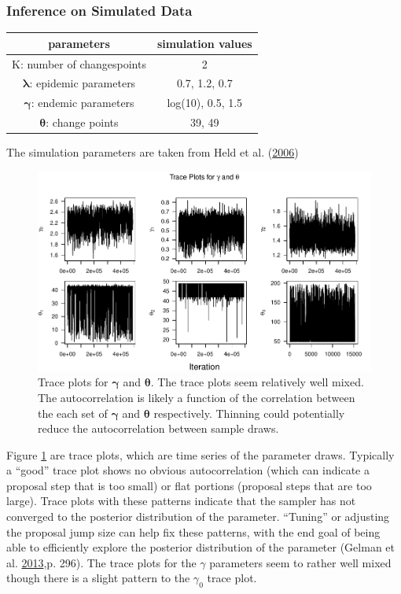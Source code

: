 \documentclass[11pt,a4paper]{article}
\numberwithin{equation}{section}
\begin{document}
\hypertarget{inference-on-simulated-data}{%
\subsubsection{Inference on Simulated
Data}\label{inference-on-simulated-data}}

\begin{longtable}[]{@{}cc@{}}
\toprule
parameters & simulation values\tabularnewline
\midrule
\endhead
K: number of changespoints & 2\tabularnewline
\(\boldsymbol{\lambda}\): epidemic parameters & 0.7, 1.2,
0.7\tabularnewline
\(\boldsymbol{\gamma}\): endemic parameters & log(10), 0.5,
1.5\tabularnewline
\(\boldsymbol{\theta}\): change points & 39, 49\tabularnewline
\bottomrule
\end{longtable}

The simulation parameters are taken from Held et al.
(\protect\hyperlink{ref-held_two-component_2006}{2006})

\begin{figure}
\centering
\includegraphics{thesis_draft_files/figure-latex/lambda_traces_plot-1.pdf}
\caption{\label{fig:lam_trace} Trace plots for \(\boldsymbol{\gamma}\)
and \(\boldsymbol{\theta}\). The trace plots seem relatively well mixed.
The autocorrelation is likely a function of the correlation between the
each set of \(\boldsymbol{\gamma}\) and \(\boldsymbol{\theta}\)
respectively. Thinning could potentially reduce the autocorrelation
between sample draws.}
\end{figure}

 Figure \ref{fig:lam_trace} are trace plots, which are time series of the
parameter draws. Typically a ``good'' trace plot shows no obvious
autocorrelation (which can indicate a proposal step that is too small)
or flat portions (proposal steps that are too large). Trace plots with
these patterns indicate that the sampler has not converged to the
posterior distribution of the parameter. ``Tuning'' or adjusting the
proposal jump size can help fix these patterns, with the end goal of
being able to efficiently explore the posterior distribution of the
parameter (Gelman et al.
\protect\hyperlink{ref-gelman_bayesian_2013}{2013},p. 296). The trace
plots for the \(\gamma\) parameters seem to rather well mixed though
there is a slight pattern to the \(\gamma_0\) trace plot.
\end{document}
